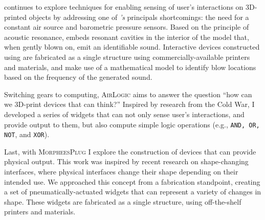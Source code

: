         \textsc{\bh} continues to explore techniques for enabling sensing of
        user's interactions on 3D-printed objects by addressing one of
        \emph{\at's} principals shortcomings: the need for a constant air source
        and barometric pressure sensors. Based on the principle of acoustic
        resonance, \emph{\bh} embeds resonant cavities in the interior of the
        model that, when gently blown on, emit an identifiable sound.
        Interactive devices constructed using \emph{\bh} are fabricated as a
        single structure using commercially-available printers and materials,
        and make use of a mathematical model to identify blow locations based on
        the frequency of the generated sound.

        Switching gears to computing, \textsc{AirLogic} aims to answer the
        question ``how can we 3D-print devices that can think?'' Inspired by
        research from the Cold War, I developed a series of widgets that can not
        only sense user's interactions, and provide output to them, but also
        compute simple logic operations (e.g., \texttt{AND, OR, NOT}, and
        \texttt{XOR}).

        \newpage
        Last, with \textsc{MorpheesPlug} I explore the construction of devices
        that can provide physical output. This work was inspired by recent
        research on shape-changing interfaces, where physical interfaces change
        their shape depending on their intended use. We approached this concept
        from a fabrication standpoint, creating a set of pneumatically-actuated
        widgets that can represent a variety of changes in shape. These widgets
        are fabricated as a single structure, using off-the-shelf printers and
        materials.